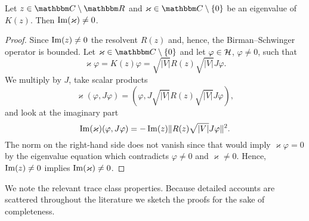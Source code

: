 \begin{lemma}\label{spectrum_K}
Let $z\in\C\setminus\R$ and $\varkappa\in\C\setminus\{0\}$ be an eigenvalue of $K(z)$. 
Then $\operatorname{Im}(\varkappa)\neq 0$.
\end{lemma}
\begin{proof}
Since $\operatorname{Im}(z)\neq 0$ the resolvent $R(z)$ and, hence, the Birman--Schwinger operator is bounded.
Let $\varkappa\in\C\setminus\{0\}$ and let $\varphi\in{\mathcal H}$, $\varphi\neq 0$, such that
\begin{equation*}
  \varkappa\varphi = K(z)\varphi = \sqrt{|V|}R(z)\sqrt{|V|}J \varphi .
\end{equation*}
We multiply by $J$, take scalar products
\begin{equation*}
  \varkappa (\varphi,J\varphi) = (\varphi,J\sqrt{|V|}R(z)\sqrt{|V|}J\varphi) ,
\end{equation*}
and look at the imaginary part
\begin{equation*}
  \operatorname{Im}(\varkappa) (\varphi,J\varphi) = -\operatorname{Im}(z) \|R(z)\sqrt{|V|}J\varphi\|^2 .
\end{equation*}
The norm on the right-hand side does not vanish since that would imply
$\varkappa\varphi=0$ by the eigenvalue equation which contradicts $\varphi\neq 0$ and 
$\varkappa\neq 0$. Hence, $\operatorname{Im}(z)\neq 0$ implies $\operatorname{Im}(\varkappa)\neq 0$.
\end{proof}

We note the relevant trace class properties. Because detailed accounts are scattered
throughout the literature we sketch the proofs for the sake of completeness.


